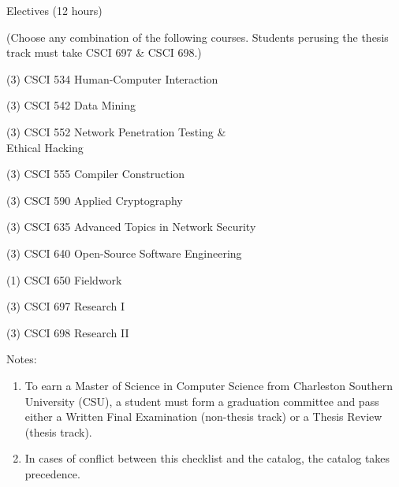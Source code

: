 \begin{reqgroup}{Electives (12 hours)}
\begin{center}%
(Choose any combination of the following courses. Students perusing the thesis track must take CSCI 697 \& CSCI 698.)\vspace{-0.5em}%
\end{center}%
\begin{checklist}
\begin{minipage}[t]{0.5\linewidth}
	\item (3) CSCI 534  Human-Computer Interaction
	\item (3) CSCI 542  Data Mining
	\item (3) CSCI 552  Network Penetration Testing \&\\Ethical Hacking
	\item (3) CSCI 555  Compiler Construction
	\item (3) CSCI 590  Applied Cryptography
\end{minipage}
\begin{minipage}[t]{0.5\linewidth}
	\item (3) CSCI 635  Advanced Topics in Network Security
	\item (3) CSCI 640  Open-Source Software Engineering
	\item (1) CSCI 650  Fieldwork
	\item (3) CSCI 697  Research I
	\item (3) CSCI 698  Research II
\end{minipage}
\end{checklist}
\end{reqgroup}

Notes:%
\begin{enumerate}\footnotesize
	\item To earn a Master of Science in Computer Science from Charleston Southern University (CSU), a student must form a graduation committee and pass either a Written Final Examination (non-thesis track) or a Thesis Review (thesis track).
	\item In cases of conflict between this checklist and the catalog, the catalog takes precedence.
\end{enumerate}